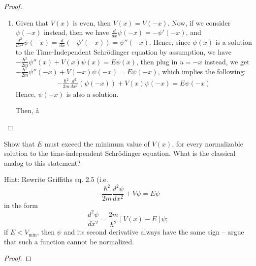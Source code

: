 \documentclass{article}
\begin{document}
\begin{proof}
\begin{enumerate}
        \hfil

        \item Given that $V(x)$ is even, then $V(x)=V(-x)$. Now, if we consider $\psi(-x)$ instead, then we have $\frac{d}{dx}\psi(-x)=-\psi'(-x)$, and $\frac{d^2}{dx^2}\psi(-x)=\frac{d}{dx}\left(-\psi'(-x)\right) = \psi''(-x)$. Hence, since $\psi(x)$ is a solution to the Time-Independent Schrödinger equation by assumption, we have $-\frac{\hbar^2}{2m}\psi''(x)+V(x)\psi(x)=E\psi(x)$, then plug in $u=-x$ instead, we get $-\frac{\hbar^2}{2m}\psi''(-x)+V(-x)\psi(-x)=E\psi(-x)$, which implies the following:
        \begin{align}
            -\frac{\hbar^2}{2m}\frac{d^2}{dx^2}(\psi(-x))+V(x)\psi(-x)=E\psi(-x)
        \end{align}
        Hence, $\psi(-x)$ is also a solution. 

        Then, å
    \end{enumerate}
\end{proof}

\newpage

\begin{ques}\label{q3}
Show that $E$ must exceed the minimum value of $V(x)$, for every normalizable solution to
the time-independent Schrödinger equation. What is the classical analog to this statement?

Hint: Rewrite Griffiths eq. 2.5 (i.e.
\[
-\frac{\hbar^2}{2m}\frac{d^2\psi}{dx^2} + V\psi = E\psi
\]
in the form
\[
\frac{d^2\psi}{dx^2} = \frac{2m}{\hbar^2}[V(x) - E]\psi;
\]
if $E < V_{\min}$, then $\psi$ and its second derivative always have the same sign – argue that such
a function cannot be normalized.
\end{ques}

\begin{proof}
\end{proof}

\newpage
\end{document}
